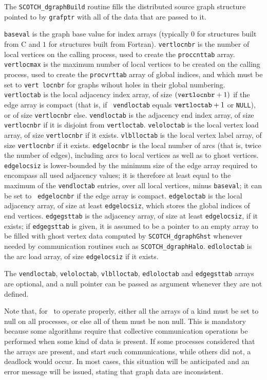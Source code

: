 \begin{itemize}
\progdes

The {\tt SCOTCH\_dgraphBuild} routine fills the distributed source
graph structure pointed to by {\tt grafptr} with all of the data that
are passed to it.

{\tt baseval} is the graph base value for index arrays (typically $0$ for
structures built from C and $1$ for structures built from Fortran).
{\tt vertlocnbr} is the number of local vertices on the calling
process, used to create the {\tt proccnttab} array.
{\tt vertlocmax} is the maximum number of local vertices to be created
on the calling process, used to create the {\tt proc\lbt vrt\lbt tab}
array of global indices, and which must be set to {\tt vert\lbt
loc\lbt nbr} for graphs wihout holes in their global numbering.
{\tt vertloctab} is the local adjacency index array, of size $({\tt
vertlocnbr} + 1)$ if the edge array is compact (that is, if {\tt
vendloctab} equals $\mbox{\tt vertloctab}+1$ or {\tt NULL}), or of
size {\tt vertlocnbr} else.
{\tt vendloctab} is the adjacency end index array, of size {\tt
vertlocnbr} if it is disjoint from {\tt vertloctab}.
{\tt veloloctab} is the local vertex load array, of size
{\tt vertlocnbr} if it exists.
{\tt vlblloctab} is the local vertex label array, of size
{\tt vertlocnbr} if it exists.
{\tt edgelocnbr} is the local number of arcs (that is, twice the
number of edges), including arcs to local vertices as well as to
ghost vertices.
{\tt edgelocsiz} is lower-bounded by the minimum size of the edge
array required to encompass all used adjacency values; it is therefore
at least equal to the maximum of the {\tt vendloctab} entries, over
all local vertices, minus {\tt baseval}; it can be set to {\tt
edgelocnbr} if the edge array is compact.
{\tt edgeloctab} is the local adjacency array, of size at least
{\tt edgelocsiz}, which stores the global indices of end vertices.
{\tt edgegsttab} is the adjacency array, of size at least
{\tt edgelocsiz}, if it exists; if {\tt edgegsttab} is given, it is
assumed to be a pointer to an empty array to be filled with ghost
vertex data computed by {\tt SCOTCH\_dgraph\lbt Ghst} whenever
needed by communication routines such as
{\tt SCOTCH\_dgraph\lbt Halo}.
{\tt edloloctab} is the arc load array, of size {\tt edgelocsiz}
if it exists.

The {\tt vendloctab}, {\tt veloloctab}, {\tt vlblloctab},
{\tt edloloctab} and {\tt edgegsttab} arrays are optional,
and a null pointer can be passed as argument whenever
they are not defined.

Note that, for \ptscotch\ to operate properly, either all the arrays
of a kind must be set to null on all processes, or else all of them
must be non null. This is mandatory because some algorithms require that
collective communication operations be performed when some kind of
data is present. If some processes considered that the arrays are
present, and start such communications, while others did not, a
deadlock would occur. In most cases, this situation will be
anticipated and an error message will be issued, stating that graph
data are inconsistent.


\end{itemize}

